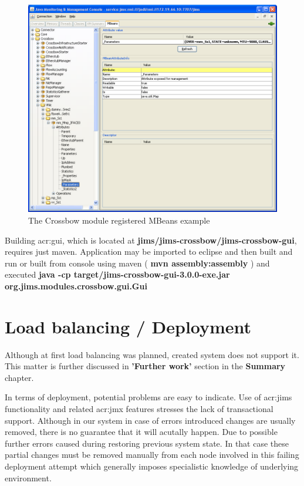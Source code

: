 \documentclass[11pt]{book}
\begin{document}
	  \begin{figure}[H]
        \begin{center}
            \includegraphics[width=1.0\textwidth]{img/impl/jconsole.png}
        \end{center}
        \caption{The Crossbow module registered MBeans example}
      \end{figure}
	  
	  Building \gls{acr:gui}, which is located at \textbf{jims/jims-crossbow/jims-crossbow-gui}, requires just maven. Application may 
	  be imported to eclipse and then built and run or built from console using maven (\textbf{ mvn assembly:assembly })
	  and executed \textbf{java -cp target/jims-crossbow-gui-3.0.0-exe.jar org.jims.modules.crossbow.gui.Gui}


    \section{Load balancing / Deployment}
    \label{sec:impl:problems}
	  
		Although at first load balancing was planned, created system does not support it. This matter is further 
		discussed in \textbf{'Further work'} section in the \textbf{Summary} chapter.
		
		In terms of deployment, potential problems are easy to indicate. Use of \gls{acr:jims} functionality and related \gls{acr:jmx} 
		features stresses the lack of transactional support. Although in our system in case of errors introduced changes
		are usually removed, there is no guarantee that it will acutally happen. Due to possible further errors caused during 
		restoring previous system state. In that case these partial changes must be removed manually from each node
		involved in this failing deployment attempt which generally imposes specialistic knowledge of underlying environment. 
\end{document}
